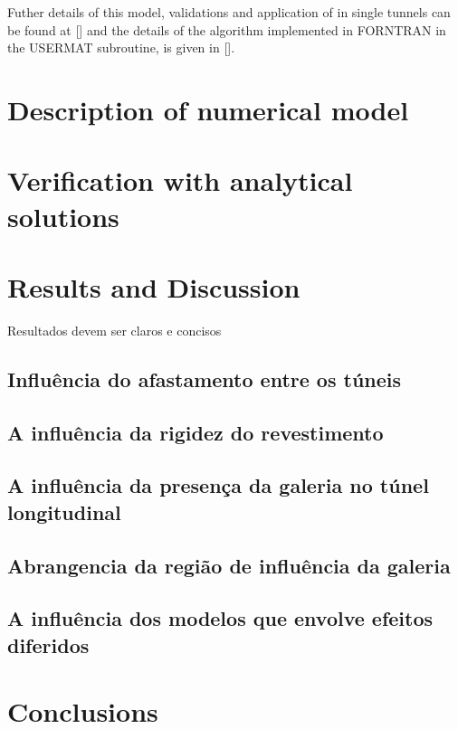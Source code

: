 \documentclass[a4paper,fleqn]{cas-sc}
\begin{document}
Futher details of this model, validations and application of in single tunnels can be found at [] and the details of the algorithm implemented in FORNTRAN in the USERMAT subroutine, is given in [].


\section{Description of numerical model}\label{}

\section{Verification with analytical solutions}\label{}

\section{Results and Discussion}\label{}

Resultados devem ser claros e concisos

\subsection{Influência do afastamento entre os túneis}\label{}

\subsection{A influência da rigidez do revestimento}\label{}

\subsection{A influência da presença da galeria no túnel longitudinal}\label{}

\subsection{Abrangencia da região de influência da galeria}\label{}

\subsection{A influência dos modelos que envolve efeitos diferidos}\label{}

\section{Conclusions}\label{}
\end{document}
